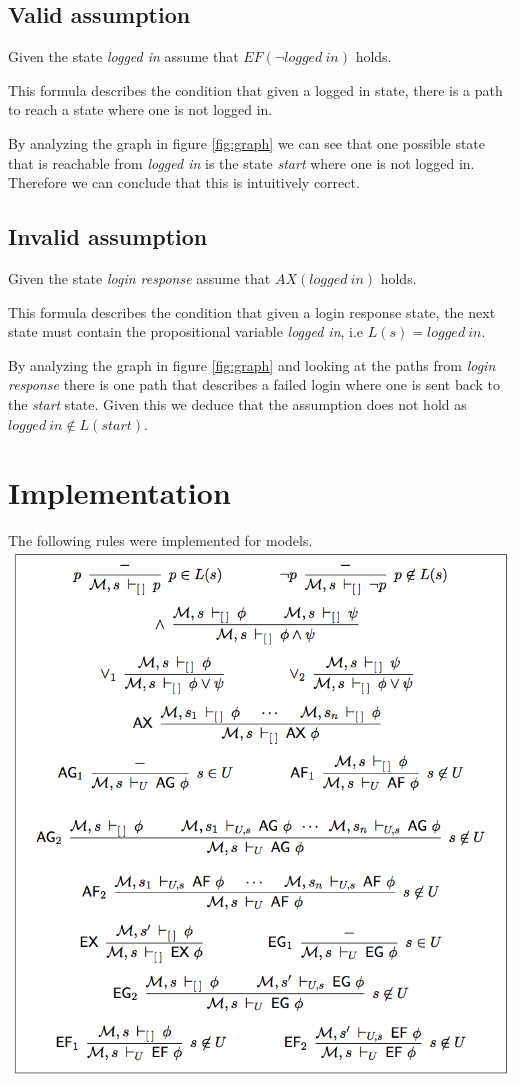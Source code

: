 \documentclass[a4paper,11pt]{article}
\begin{document}
\newpage
\subsection{Valid assumption}
Given the state \textit{logged in} assume that $EF(\neg logged \: in)$ holds.

This formula describes the condition that given a logged in state, there is a path
to reach a state where one is not logged in.

By analyzing the graph in figure \ref{fig:graph} we can see that one possible state that is reachable from
\textit{logged in} is the state \textit{start} where one is not logged in. Therefore we can conclude that this is intuitively correct.

\subsection{Invalid assumption}
Given the state \textit{login response} assume that $AX(logged \: in)$ holds.

This formula describes the condition that given a login response state, the next state must contain the propositional variable \textit{logged in}, i.e $L(s)=logged \: in$.

By analyzing the graph in figure \ref{fig:graph} and looking at the paths from \textit{login response} there is one path that describes a failed login where one is sent back to the \textit{start} state. Given this we deduce that the assumption does not hold as $logged \: in \notin L(start)$.

\section{Implementation}

The following rules were implemented for models.
\newline
\includegraphics[scale=0.48]{rules.png}
\newpage
\end{document}
